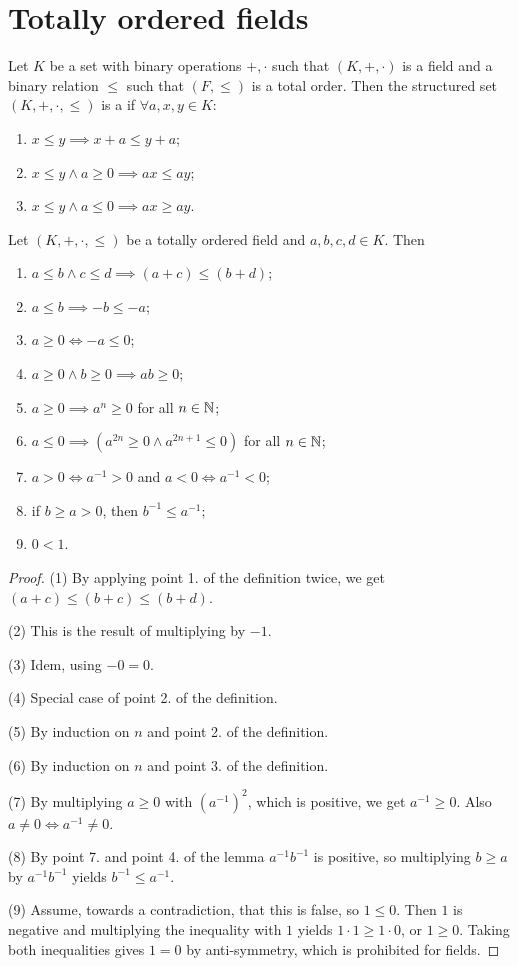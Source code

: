 \section{Totally ordered fields}
\begin{definition}
Let $K$ be a set with binary operations $+,\cdot$ such that $(K,+,\cdot)$ is a field and a binary relation $\leq$ such that $(F,\leq)$ is a total order. Then the structured set $(K,+,\cdot,\leq)$ is a  if $\forall a,x,y\in K$:
\begin{enumerate}
\item $x\leq y \implies x+a \leq y+a$;
\item $x\leq y \land a\geq 0 \implies ax \leq ay$;
\item $x\leq y \land a\leq 0 \implies ax \geq ay$.
\end{enumerate}
\end{definition}

\begin{lemma}
Let $(K,+,\cdot,\leq)$ be a totally ordered field and $a,b,c,d\in K$. Then
\begin{enumerate}
\item $a\leq b \land c\leq d \implies (a+c) \leq (b+d)$;
\item $a\leq b \implies -b\leq -a$;
\item $a\geq 0 \iff -a\leq 0$;
\item $a\geq 0 \land b\geq 0 \implies ab \geq 0$;
\item $a\geq 0 \implies a^n \geq 0$ for all $n\in\mathbb{N}$;
\item $a\leq 0 \implies (a^{2n} \geq 0 \land a^{2n+1}\leq 0)$ for all $n\in\mathbb{N}$;
\item $a > 0 \iff a^{-1} > 0$ and $a < 0 \iff a^{-1} < 0$;
\item if $b \geq a>0$, then $b^{-1} \leq a^{-1}$;
\item $0<1$.
\end{enumerate}
\end{lemma}
\begin{proof}
(1) By applying point 1. of the definition twice, we get $(a+c)\leq(b+c)\leq(b+d)$.

(2) This is the result of multiplying by $-1$.

(3) Idem, using $-0=0$.

(4) Special case of point 2. of the definition.

(5) By induction on $n$ and point 2. of the definition.

(6) By induction on $n$ and point 3. of the definition.

(7) By multiplying $a \geq 0$ with $(a^{-1})^{2}$, which is positive, we get $a^{-1}\geq 0$. Also $a\neq 0 \iff a^{-1}\neq 0$.

(8) By point 7. and point 4. of the lemma $a^{-1}b^{-1}$ is positive, so multiplying $b\geq a$ by $a^{-1}b^{-1}$ yields $b^{-1} \leq a^{-1}$.

(9) Assume, towards a contradiction, that this is false, so $1\leq 0$. Then $1$ is negative and multiplying the inequality with $1$ yields $1\cdot 1 \geq 1\cdot 0$, or $1\geq 0$. Taking both inequalities gives $1=0$ by anti-symmetry, which is prohibited for fields.
\end{proof}

